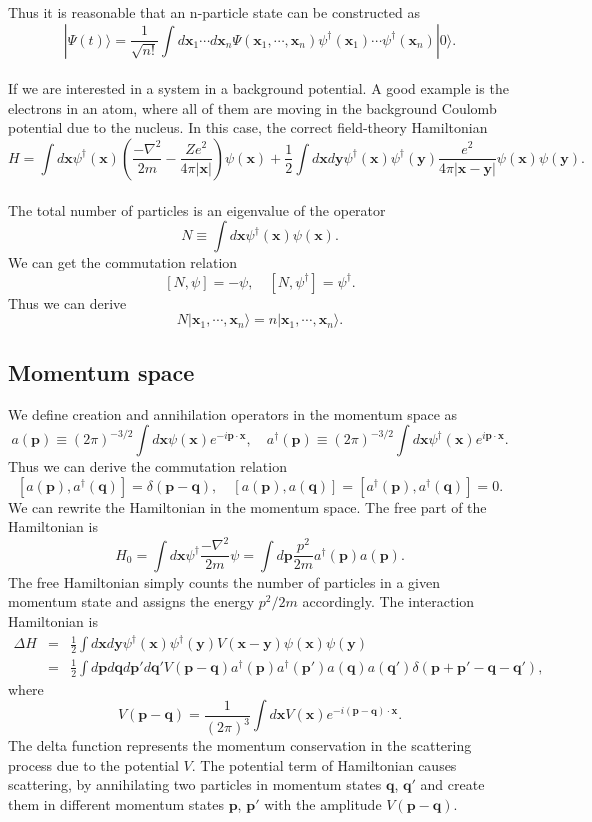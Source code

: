 Thus it is reasonable that  an n-particle state can be constructed as
\[|\Psi(t)\rangle = \frac{1}{\sqrt{n!}} \int d\bm{x}_1 \cdots d\bm{x}_n \Psi(\bm{x}_1,\cdots,\bm{x}_n) \psi^{\dagger}(\bm{x}_1)\cdots\psi^{\dagger}(\bm{x}_n)|0\rangle.\]
\\
If we are interested in a system in a background potential.  
A good example is the electrons in an atom, where all of them are moving in the background Coulomb potential due to the nucleus. In this case, the correct field-theory Hamiltonian
\[H = \int d\bm{x} \psi^{\dagger}(\bm{x}) \left(\frac{-\nabla^2}{2m} - \frac{Ze^2}{4\pi |\bm{x}|} \right)\psi(\bm{x}) + \frac{1}{2}\int d\bm{x} d\bm{y} \psi^{\dagger}(\bm{x}) \psi^{\dagger}(\bm{y}) \frac{e^2}{4\pi|\bm{x}-\bm{y}|} \psi(\bm{x})\psi(\bm{y}).\]
\\
The total number of particles is an eigenvalue of the operator
\[N \equiv \int d\bm{x} \psi^{\dagger}(\bm{x})\psi(\bm{x}).\]
We can get the commutation relation
\[[N,\psi] = -\psi , \quad [N,\psi^{\dagger}] = \psi^{\dagger}.\]
Thus we can derive
\[N|\bm{x}_1,\cdots,\bm{x}_n\rangle = n|\bm{x}_1,\cdots,\bm{x}_n\rangle.\]

\subsection{Momentum space}
We define creation and annihilation operators in the
momentum space as
\[a(\bm{p}) \equiv (2\pi)^{-3/2}\int d\bm{x} \psi(\bm{x}) e^{-i\bm{p}\cdot\bm{x}} , \quad a^{\dagger}(\bm{p}) \equiv  (2\pi)^{-3/2} \int d\bm{x} \psi^{\dagger}(\bm{x}) e^{i\bm{p}\cdot\bm{x}}.\]
Thus we can derive the commutation relation
\[[a(\bm{p}),a^{\dagger}(\bm{q})] = \delta(\bm{p}-\bm{q}) , \quad [a(\bm{p}),a(\bm{q})] = [a^{\dagger}(\bm{p}),a^{\dagger}(\bm{q})] = 0.\]
We can rewrite the Hamiltonian in the momentum space. The
free part of the Hamiltonian is
\[H_0 = \int d\bm{x} \psi^{\dagger} \frac{-\nabla^2}{2m} \psi = \int d\bm{p} \frac{p^2}{2m} a^{\dagger}(\bm{p})a(\bm{p}).\]
The free Hamiltonian simply counts the number of particles in a given momentum state and assigns the energy ${p^2}/{2m}$ accordingly.
The interaction Hamiltonian is
\begin{eqnarray}
\Delta H &=& \frac{1}{2}\int d\bm{x} d\bm{y} \psi^{\dagger}(\bm{x}) \psi^{\dagger}(\bm{y}) V(\bm{x} - \bm{y}) \psi(\bm{x})\psi(\bm{y})  \nonumber \\
&=& \frac{1}{2} \int d\bm{p}d\bm{q}d\bm{p}'d\bm{q}' V(\bm{p}-\bm{q}) a^{\dagger}(\bm{p}) a^{\dagger}(\bm{p}') a(\bm{q}) a(\bm{q}') \delta(\bm{p}+\bm{p}'-\bm{q}-\bm{q}'),\nonumber
\end{eqnarray}
where
\[V(\bm{p}-\bm{q}) = \frac{1}{(2\pi)^3} \int d\bm{x} V(\bm{x}) e^{-i(\bm{p}-\bm{q})\cdot\bm{x}}.\]
The delta function represents the momentum conservation in the scattering process due to the potential $V$. The potential term of Hamiltonian causes scattering, by annihilating two particles in momentum states $\bm{q}$, $\bm{q}'$ and create them in different momentum states $\bm{p}$, $\bm{p}'$ with the amplitude
$V(\bm{p}-\bm{q})$.

